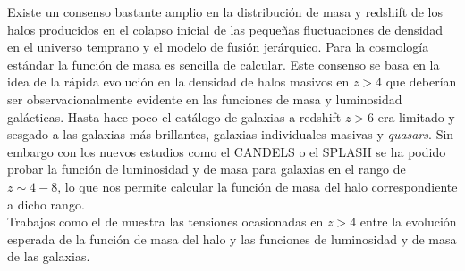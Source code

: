 \documentclass{article}
\begin{document}
Existe un consenso bastante amplio en la distribución de masa y redshift de los halos producidos en el colapso inicial de las pequeñas fluctuaciones de densidad en el universo temprano y el modelo de fusión jerárquico. Para la cosmología estándar la función de masa es sencilla de calcular. Este consenso se basa en la idea de la rápida evolución en la densidad de halos masivos en $z>4$ que deberían ser observacionalmente evidente en las funciones de masa y luminosidad galácticas. Hasta hace poco el catálogo de galaxias a redshift $z>6$ era limitado y sesgado a las galaxias más brillantes, galaxias individuales masivas y \textit{quasars}. Sin embargo con los nuevos estudios como el CANDELS o el SPLASH se ha podido probar la función de luminosidad y de masa para galaxias en el rango de $z\sim 4-8$, lo que nos permite calcular la función de masa del halo correspondiente a dicho rango.\\

Trabajos como el de \cite{finkelstein2015increasing} muestra las tensiones ocasionadas en $z>4$ entre la evolución esperada de la función de masa del halo y las funciones de luminosidad y de masa de las galaxias. \\


\end{document}
